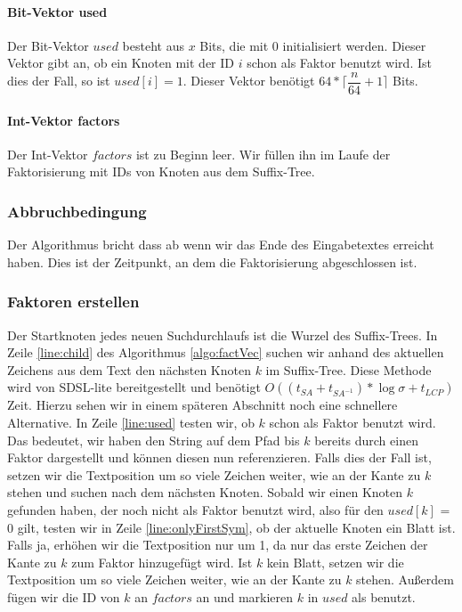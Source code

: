\documentclass[a4paper,11pt]{scrartcl}%
\theoremstyle{change}
\theoremstyle{nonumberplain}
\theoremstyle{change}
\theoremstyle{nonumberplain}
\theoremstyle{change}
\theoremstyle{nonumberplain}
\begin{document}
\paragraph{Bit-Vektor used}

Der Bit-Vektor $used$ besteht aus $x$ Bits, die mit 0 initialisiert werden. Dieser Vektor gibt an, ob ein Knoten mit der ID $i$ schon als Faktor benutzt wird.
Ist dies der Fall, so ist $used[i]=1$. Dieser Vektor benötigt $64*\lceil\dfrac{n}{64}+1\rceil$ Bits.\cite{sdsl}

\paragraph{Int-Vektor factors}

Der Int-Vektor $factors$ ist zu Beginn leer. Wir füllen ihn im Laufe der Faktorisierung mit IDs von Knoten aus dem Suffix-Tree.  

\subsubsection{Abbruchbedingung}

Der Algorithmus bricht dass ab wenn wir das Ende des Eingabetextes erreicht haben. Dies ist der Zeitpunkt, an dem die Faktorisierung abgeschlossen ist.

\subsubsection{Faktoren erstellen}

Der Startknoten jedes neuen Suchdurchlaufs ist die Wurzel des Suffix-Trees.
In Zeile \ref{line:child} des Algorithmus \ref{algo:factVec}  suchen wir anhand des aktuellen Zeichens aus dem Text den nächsten Knoten $k$ im Suffix-Tree. Diese Methode wird von SDSL-lite bereitgestellt und benötigt $O((t_{SA}+t_{SA^{-1}}) * \log \sigma + t_{LCP})$ Zeit. Hierzu sehen wir in einem späteren Abschnitt noch eine schnellere Alternative. In Zeile \ref{line:used} testen wir, ob $k$ schon als Faktor benutzt wird. Das bedeutet, wir haben den String  auf dem Pfad bis $k$ bereits durch einen Faktor dargestellt und können diesen nun referenzieren. Falls dies der Fall ist, setzen wir die Textposition um so viele Zeichen weiter, wie an der Kante zu $k$ stehen und suchen nach dem nächsten Knoten. Sobald wir einen Knoten $k$ gefunden haben, der noch nicht als Faktor benutzt wird, also für den $used[k]$ = 0 gilt, testen wir in Zeile \ref{line:onlyFirstSym}, ob der aktuelle Knoten ein Blatt ist. Falls ja, erhöhen wir die Textposition nur um 1, da nur das erste Zeichen der Kante zu $k$ zum Faktor hinzugefügt wird. Ist $k$ kein Blatt, setzen wir die Textposition um so viele Zeichen weiter, wie an der Kante zu $k$ stehen. Außerdem fügen wir die ID von $k$ an $factors$ an und markieren $k$ in $used$ als benutzt.
\end{document}

